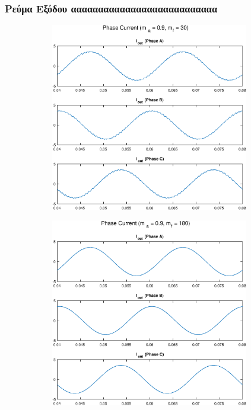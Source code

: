 \clearpage
\subsubsection*{Ρεύμα Εξόδου ααααααααααααααααααααααααααα}
\begin{figure}[h!]
	\begin{subfigure}{0.49\textwidth}
		\centering
		\includegraphics[width=0.95\textwidth]{Images/4_Phase_I_30.eps}
	\end{subfigure}
	\begin{subfigure}{0.49\textwidth}
		\centering
		\includegraphics[width=0.95\textwidth]{Images/4_Phase_I_180.eps}
	\end{subfigure}
\end{figure}

